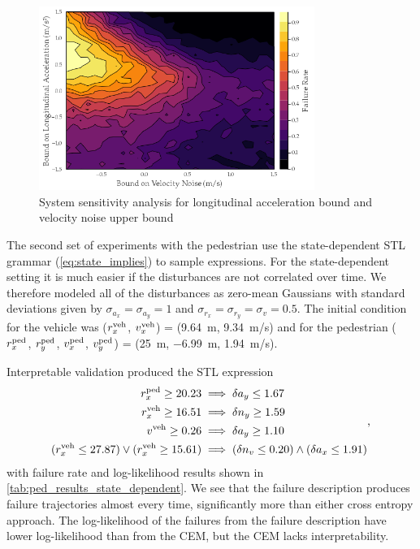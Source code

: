 \begin{figure}
    \centering
    \includegraphics[width=0.8\textwidth]{figures/interpretable_validation/stl_result_sensitivity.png}
    \caption{System sensitivity analysis for longitudinal acceleration bound and velocity noise upper bound}
    \label{fig:stl_ped_sensititivty}
\end{figure}

The second set of experiments with the pedestrian use the state-dependent STL grammar (\cref{eq:state_implies}) to sample expressions. For the state-dependent setting it is much easier if the disturbances are not correlated over time. We therefore modeled all of the disturbances as zero-mean Gaussians with standard deviations given by $\sigma_{a_x} = \sigma_{a_y} = 1$ and $\sigma_{r_x} = \sigma_{r_y} = \sigma_{v} = 0.5$. The initial condition for the vehicle was ($r_x^{\rm veh}$, $v_x^{\rm veh}$) = (\SI{9.64}{m}, \SI{9.34}{m/s}) and for the pedestrian ($r^{\rm ped}_x$, $r^{\rm ped}_y$, $v^{\rm ped}_x$, $v^{\rm ped}_y$) = (\SI{25}{m}, \SI{-6.99}{m}, \SI{1.94}{m/s}). 

Interpretable validation produced the STL expression
\begin{equation}
\begin{split}
r_x^{\rm ped} \geq 20.23 &\implies \delta a_y \leq 1.67 \\
r_x^{\rm veh} \geq 16.51 &\implies \delta n_y \geq 1.59 \\
v^{\rm veh} \geq 0.26 &\implies \delta a_y \geq 1.10 \\
(r_x^{\rm veh} \leq 27.87) \lor (r_x^{\rm veh} \geq 15.61) &\implies (\delta n_v \leq 0.20) \land (\delta a_x \leq 1.91)
\end{split} \label{eq:failure_description_ped_state_dep} \text{,}
\end{equation}
with failure rate and log-likelihood results shown in \cref{tab:ped_results_state_dependent}. We see that the failure description produces failure trajectories almost every time, significantly more than either cross entropy approach. The log-likelihood of the failures from the failure description have lower log-likelihood than from the CEM, but the CEM lacks interpretability. 

